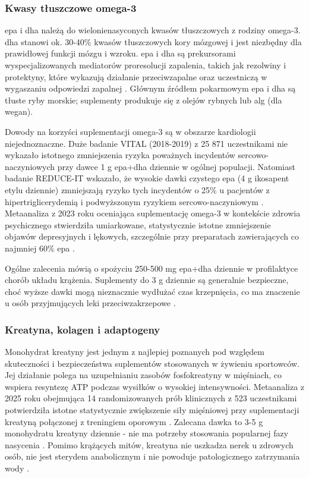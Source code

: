 \subsubsection{Kwasy tłuszczowe omega-3}

\Gls{epa} i \gls{dha} należą do wielonienasyconych kwasów tłuszczowych z rodziny omega-3. \gls{dha} stanowi ok. 30-40\% kwasów tłuszczowych kory mózgowej i jest niezbędny dla prawidłowej funkcji mózgu i wzroku. \gls{epa} i \gls{dha} są prekursorami wyspecjalizowanych mediatorów proresolucji zapalenia, takich jak rezolwiny i protektyny, które wykazują działanie przeciwzapalne oraz uczestniczą w wygaszaniu odpowiedzi zapalnej \cite{nccih2024}. Głównym źródłem pokarmowym \gls{epa} i \gls{dha} są tłuste ryby morskie; suplementy produkuje się z olejów rybnych lub alg (dla wegan).

Dowody na korzyści suplementacji omega-3 są w obszarze kardiologii niejednoznaczne. Duże badanie VITAL (2018-2019) z 25 871 uczestnikami nie wykazało istotnego zmniejszenia ryzyka poważnych incydentów sercowo-naczyniowych przy dawce 1 g \gls{epa}+\gls{dha} dziennie w ogólnej populacji. Natomiast badanie REDUCE-IT wskazało, że wysokie dawki czystego \gls{epa} (4 g ikosapent etylu dziennie) zmniejszają ryzyko tych incydentów o 25\% u pacjentów z hipertriglicerydemią i podwyższonym ryzykiem sercowo-naczyniowym \cite{nccih2024}. Metaanaliza z 2023 roku oceniająca suplementację omega-3 w kontekście zdrowia psychicznego stwierdziła umiarkowane, statystycznie istotne zmniejszenie objawów depresyjnych i lękowych, szczególnie przy preparatach zawierających co najmniej 60\% \gls{epa} \cite{nccih2024}.

Ogólne zalecenia mówią o spożyciu 250-500 mg \gls{epa}+\gls{dha} dziennie w profilaktyce chorób układu krążenia. Suplementy do 3 g dziennie są generalnie bezpieczne, choć wyższe dawki mogą nieznacznie wydłużać czas krzepnięcia, co ma znaczenie u osób przyjmujących leki przeciwzakrzepowe \cite{nccih2024}.


\subsubsection{Kreatyna, kolagen i adaptogeny}

Monohydrat kreatyny jest jednym z najlepiej poznanych pod względem skuteczności i bezpieczeństwa suplementów stosowanych w żywieniu sportowców. Jej działanie polega na uzupełnianiu zasobów fosfokreatyny w mięśniach, co wspiera resyntezę ATP podczas wysiłków o wysokiej intensywności. Metaanaliza z 2025 roku obejmująca 14 randomizowanych prób klinicznych z 523 uczestnikami potwierdziła istotne statystycznie zwiększenie siły mięśniowej przy suplementacji kreatyną połączonej z treningiem oporowym \cite{antonio2021common}. Zalecana dawka to 3-5 g monohydratu kreatyny dziennie - nie ma potrzeby stosowania popularnej fazy nasycenia \cite{antonio2021common}. Pomimo krążących mitów, kreatyna nie uszkadza nerek u zdrowych osób, nie jest sterydem anabolicznym i nie powoduje patologicznego zatrzymania wody \cite{antonio2021common}.

